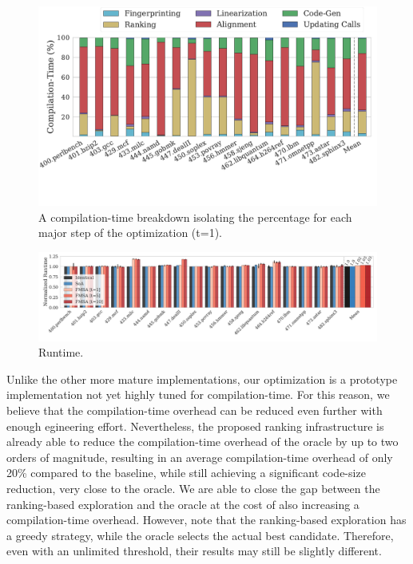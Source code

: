 \begin{figure}[b]
  \centering
  \includegraphics[width=1.0\linewidth]{figs/compilation-time-breakdown-sqrd.pdf}
  \vspace{-8.5ex}
  \caption{A compilation-time breakdown isolating the percentage for each major
           step of the optimization (t=1).}%
  \label{fig:compilation-time-breakdown}
\end{figure}

\begin{figure}[t]
  \centering
  \includegraphics[width=\linewidth]{figs/runtime-impact.pdf}
  \vspace{-4ex}
  \caption{Runtime.}
  \label{fig:runtime-impact}
\end{figure}

Unlike the other more mature implementations, our optimization is a prototype
implementation not yet highly tuned for compilation-time.
For this reason, we believe that the compilation-time overhead can be reduced
even further with enough egineering effort.
Nevertheless, the proposed ranking infrastructure is already able to reduce the
compilation-time overhead of the oracle by up to two orders of magnitude,
resulting in  an average compilation-time overhead of only 20\% compared to the
baseline, while still achieving a significant code-size reduction, very close to
the oracle.
We are able to close the gap between the ranking-based exploration and the
oracle at the cost of also increasing a compilation-time overhead.
However, note that the ranking-based exploration has a greedy strategy, while
the oracle selects the actual best candidate.
Therefore, even with an unlimited threshold, their results may still be slightly
different.

